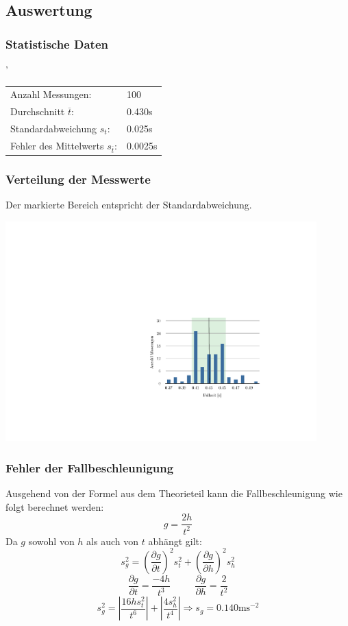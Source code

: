 \documentclass[12pt,a4paper]{article}
\begin{document}
\subsection*{Auswertung}
\subsubsection*{Statistische Daten}'
\begin{tabular}{ll}
Anzahl Messungen:&100\\
Durchschnitt $\overline{t}$:&0.430s\\
Standardabweichung $s_t$:&0.025s\\
Fehler des Mittelwerts $s_{\overline{t}}$:&0.0025s\\	
\end{tabular}

\subsubsection*{Verteilung der Messwerte}
Der markierte Bereich entspricht der Standardabweichung.

\begin{center}
\includegraphics[width=12cm]{histogram.pdf}
\end{center}

\subsubsection*{Fehler der Fallbeschleunigung}
Ausgehend von der Formel aus dem Theorieteil kann die Fallbeschleunigung wie folgt berechnet werden:
\[ g = \frac{2h}{t^2} \]
Da $g$ sowohl von $h$ als auch von $t$ abh\"angt gilt:
\[ s_g^2 = \left( \frac{\partial g}{\partial t}\right)^2 s_t^2 + \left( \frac{\partial g}{\partial h}\right)^2 s_{h}^2 \]
\[ \frac{\partial g}{\partial t} = \frac{-4h}{t^3} \hspace{30pt} \frac{\partial g}{\partial h} = \frac{2}{t^2} \]
\[ s_g^2 = \left| \frac{16hs_t^2}{t^6}\right| + \left| \frac{4s_h^2}{t^4}\right| \Rightarrow s_g = 0.140 \mbox{ms}^{-2} \]
\end{document}
